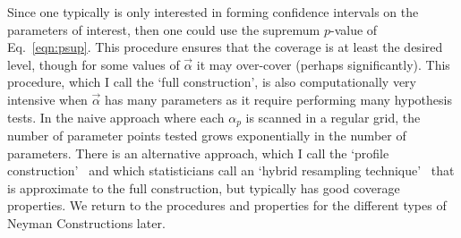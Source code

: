 Since one typically is only interested in forming confidence intervals on the parameters of interest, then one could use the supremum $p$-value of Eq.~\ref{eqn:psup}.  This procedure ensures that the coverage is at least the desired level, though for some values of $\vec\alpha$ it may over-cover (perhaps significantly).  This procedure, which I call the `full construction',  is also computationally very intensive when $\vec\alpha$ has many parameters as it require performing many hypothesis tests.  In the naive approach where each $\alpha_p$ is scanned in a regular grid, the number of parameter points tested grows exponentially in the number of parameters.  There is an alternative approach, which I call the `profile construction'~\cite{Feldman,Cranmer:2005hi}
and which statisticians call an `hybrid resampling technique'~ \cite{Hybrid,Bodhi} that is approximate to the full construction, but typically has good coverage properties.  We return to the procedures and properties for the different types of Neyman Constructions later.
